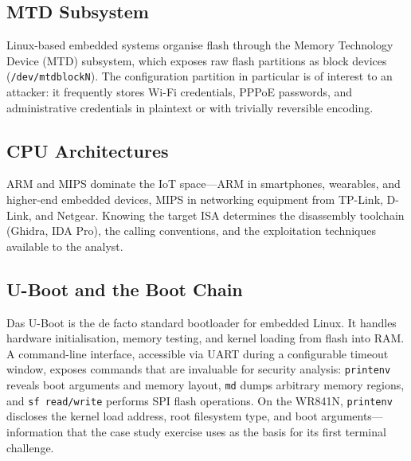 \subsection{MTD Subsystem}\label{subsec:mtd}

Linux-based embedded systems organise flash through the Memory Technology Device (MTD) subsystem, which exposes raw flash partitions as block devices (\texttt{/dev/mtdblockN}). The configuration partition in particular is of interest to an attacker: it frequently stores Wi-Fi credentials, PPPoE passwords, and administrative credentials in plaintext or with trivially reversible encoding.

\subsection{CPU Architectures}\label{subsec:cpu-arch}

ARM and MIPS dominate the IoT space---ARM in smartphones, wearables, and higher-end embedded devices, MIPS in networking equipment from TP-Link, D-Link, and Netgear. Knowing the target ISA determines the disassembly toolchain (Ghidra, IDA Pro), the calling conventions, and the exploitation techniques available to the analyst.

\subsection{U-Boot and the Boot Chain}\label{subsec:uboot}

Das U-Boot is the de facto standard bootloader for embedded Linux. It handles hardware initialisation, memory testing, and kernel loading from flash into RAM. A command-line interface, accessible via UART during a configurable timeout window, exposes commands that are invaluable for security analysis: \texttt{printenv} reveals boot arguments and memory layout, \texttt{md} dumps arbitrary memory regions, and \texttt{sf read/write} performs SPI flash operations. On the WR841N, \texttt{printenv} discloses the kernel load address, root filesystem type, and boot arguments---information that the \pcbctf{} case study exercise uses as the basis for its first terminal challenge.

